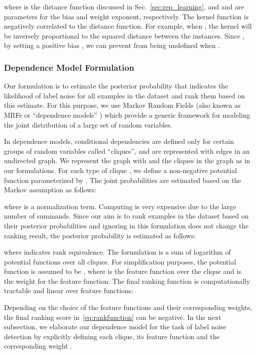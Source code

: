 where  is the distance function discussed in Sec.~\ref{sec:rep_learning}, and  and  are parameters for the bias and weight exponent, respectively. The kernel function is negatively correlated to the distance function. For example, when , the kernel will be inversely proportional to the squared distance between the instances. Since , by setting a positive bias , we can prevent  from being undefined when .

\subsubsection {Dependence Model Formulation} \label{sec:dep_formulate}

Our formulation is to estimate the posterior probability  that indicates the likelihood of label noise for all examples  in the dataset  and rank them based on this estimate. 
For this purpose, we use Markov Random Fields (also known as MRFs or ``dependence models'' \cite{MetzlerMRF05,YalnizPAMI19}) which provide a generic framework for modeling the joint distribution of a large set of random variables. 

In dependence models, conditional dependencies are defined only for certain groups of random variables called ``cliques'', and are represented with edges in an undirected graph. We represent the graph with  and the cliques in the graph as  in our formulations. For each type of clique , we define a non-negative potential function  parameterized by . The joint probabilities are estimated based on the Markov assumption as follows:


where  is a normalization term.
Computing  is very expensive due to the large number of summands. Since our aim is to rank examples in the dataset based on their posterior probabilities  and ignoring  in this formulation does not change the ranking result, the posterior probability is estimated as follows:  

where  indicates rank equivalence. The formulation is a sum of logarithm of potential functions over all cliques. For simplification purposes, the potential function is assumed to be ,
where  is the feature function over the clique  and
 is the weight for the feature function.
The final ranking function is computationally tractable and linear over feature functions:


Depending on the choice of the feature functions and their corresponding weights, the final ranking score in~\ref{eq:rankfunction} can be negative. In the next subsection, we elaborate our dependence model for the task of label noise detection by explicitly defining each clique, its feature function  and the corresponding weight .







